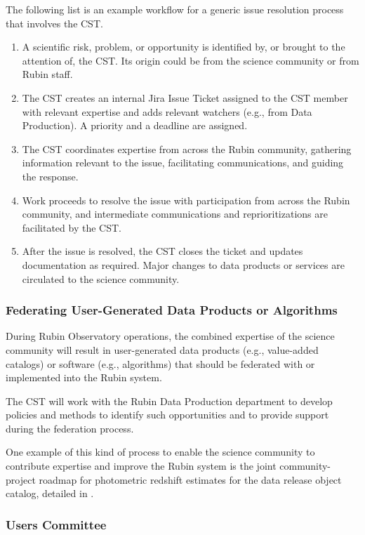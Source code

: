 \documentclass[DM,authoryear,toc]{lsstdoc}
\begin{document}
The following list is an example workflow for a generic issue resolution process that involves the CST.
\begin{enumerate}
\item A scientific risk, problem, or opportunity is identified by, or brought to the attention of, the CST. Its origin could be from the science community or from Rubin staff.
\item The CST creates an internal Jira Issue Ticket assigned to the CST member with relevant expertise and adds relevant watchers (e.g., from Data Production). A priority and a deadline are assigned. 
\item The CST coordinates expertise from across the Rubin community, gathering information relevant to the issue, facilitating communications, and guiding the response.
\item Work proceeds to resolve the issue with participation from across the Rubin community, and intermediate communications and reprioritizations are facilitated by the CST.
\item After the issue is resolved, the CST closes the ticket and updates documentation as required. Major changes to data products or services are circulated to the science community.
\end{enumerate}


\subsubsection{Federating User-Generated Data Products or Algorithms}\label{sssec:mod_coord_ug}

During Rubin Observatory operations, the combined expertise of the science community will result in user-generated data products (e.g., value-added catalogs) or software (e.g., algorithms) that should be federated with or implemented into the Rubin system.

The CST will work with the Rubin Data Production department to develop policies and methods to identify such opportunities and to provide support during the federation process.

One example of this kind of process to enable the science community to contribute expertise and improve the Rubin system is the joint community-project roadmap for photometric redshift estimates for the data release object catalog, detailed in .


\subsubsection{Users Committee}\label{sssec:mod_coord_uc}
\end{document}
